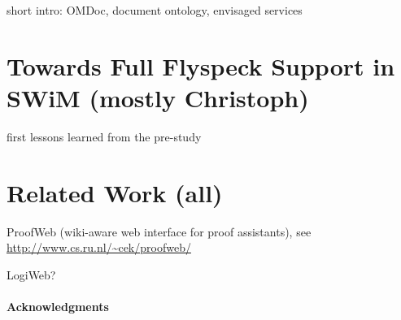 \documentclass{llncs}
\begin{document}
short intro: OMDoc, document ontology, envisaged services

\section{Towards Full Flyspeck Support in SWiM (mostly Christoph)}
\label{sec:flyspeck-swim}

first lessons learned from the pre-study

\section{Related Work (all)}
\label{sec:related}

ProofWeb (wiki-aware web interface for proof assistants), see
\url{http://www.cs.ru.nl/~cek/proofweb/}

LogiWeb?

\paragraph{Acknowledgments}
\label{sec:ack}





\ednotemessage
\end{document}
